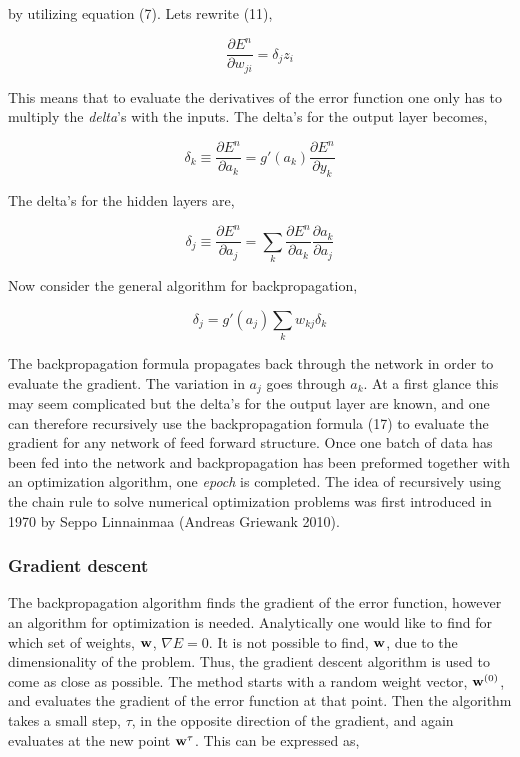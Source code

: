 \documentclass[12pt, letterpaper]{amsart}%
\begin{document}
by utilizing equation (7). Lets rewrite (11),

\begin{equation}
    \frac{\partial E^n}{\partial w_{ji}} = \delta_j z_i
\end{equation}

This means that to evaluate the derivatives of the error function one only has to multiply the \textit{delta}'s with the inputs. The delta's for the output layer becomes,

\begin{equation}
    \delta_k \equiv \frac{\partial E^n}{\partial a_k} = g \prime (a_k) \frac{\partial E^n}{\partial y_k}
\end{equation}

The delta's for the hidden layers are,

\begin{equation}
    \delta_j \equiv \frac{\partial E^n}{\partial a_j} = \sum_k \frac{\partial E^n}{\partial a_k} \frac{\partial a_k}{\partial a_j}
\end{equation}

Now consider the general algorithm for backpropagation,

\begin{equation}
    \delta_j = g \prime (a_j) \sum_k w_{kj} \delta_k
\end{equation}

The backpropagation formula propagates back through the network in order to evaluate the gradient. The variation in $a_j$ goes through $a_k$. At a first glance this may seem complicated but the delta's for the output layer are known, and one can therefore recursively use the backpropagation formula (17) to evaluate the gradient for any network of feed forward structure. Once one batch of data has been fed into the network and backpropagation has been preformed together with an optimization algorithm, one \textit{epoch} is completed. The idea of recursively using the chain rule to solve numerical optimization problems was first introduced in 1970 by Seppo Linnainmaa (Andreas Griewank 2010).

\subsubsection{Gradient descent}
The backpropagation algorithm finds the gradient of the error function, however an algorithm for optimization is needed. Analytically one would like to find for which set of weights, $\bold{w}$, $\nabla E=0$. It is not possible to find, $\bold{w}$, due to the dimensionality of the problem. Thus, the gradient descent algorithm is used to come as close as possible. The method starts with a random weight vector, $\bold{w}^{(0)}$, and evaluates the gradient of the error function at that point. Then the algorithm takes a small step, $\tau$, in the opposite direction of the gradient, and again evaluates at the new point $\bold{w}^{\tau}$. This can be expressed as,
\end{document}
